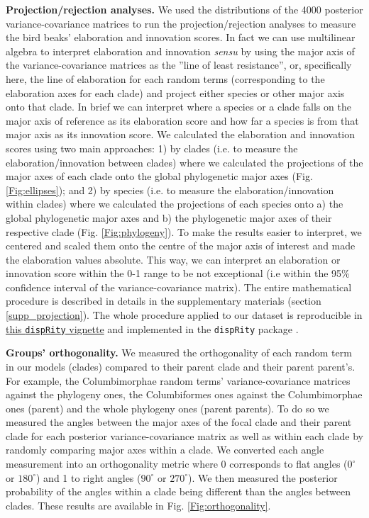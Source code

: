 \documentclass[12pt,letterpaper]{article}
\begin{document}
\textbf{Projection/rejection analyses.}
We used the distributions of the 4000 posterior variance-covariance matrices to run the projection/rejection analyses to measure the bird beaks' elaboration and innovation scores.
In fact we can use multilinear algebra to interpret elaboration and innovation \textit{sensu} \cite{endler2005animal} by using the major axis of the variance-covariance matrices as the ''line of least resistance'', or, specifically here, the line of elaboration for each random terms (corresponding to the elaboration axes for each clade) and project either species or other major axis onto that clade.
In brief we can interpret where a species or a clade falls on the major axis of reference as its elaboration score and how far a species is from that major axis as its innovation score.
We calculated the elaboration and innovation scores using two main approaches:
1) by clades (i.e. to measure the elaboration/innovation between clades) where we calculated the projections of the major axes of each clade onto the global phylogenetic major axes (Fig. \ref{Fig:ellipses});
and 2) by species (i.e. to measure the elaboration/innovation within clades) where we calculated the projections of each species onto a) the global phylogenetic major axes and b) the phylogenetic major axes of their respective clade (Fig. \ref{Fig:phylogeny}).
To make the results easier to interpret, we centered and scaled them onto the centre of the major axis of interest and made the elaboration values absolute.
This way, we can interpret an elaboration or innovation score within the 0-1 range to be not exceptional (i.e within the 95\% confidence interval of the variance-covariance matrix).
The entire mathematical procedure is described in details in the supplementary materials (section \ref{supp_projection}).
The whole procedure applied to our dataset is reproducible in \href{https://raw.rawgit.net/TGuillerme/dispRity/master/inst/vignettes/Projection_analysis.html}{this \texttt{dispRity} vignette} %
and implemented in the \texttt{dispRity} package \cite{dispRity}.

\textbf{Groups' orthogonality.}
We measured the orthogonality of each random term in our models (clades) compared to their parent clade and their parent parent's.
For example, the Columbimorphae random terms' variance-covariance matrices against the phylogeny ones, the Columbiformes ones against the Columbimorphae ones (parent) and the whole phylogeny ones (parent parents).
To do so we measured the angles between the major axes of the focal clade and their parent clade for each posterior variance-covariance matrix as well as within each clade by randomly comparing major axes within a clade.
We converted each angle measurement into an orthogonality metric where 0 corresponds to flat angles ($0^\circ$ or  $180^\circ$) and 1 to right angles ($90^\circ$ or $270^\circ$).
We then measured the posterior probability of the angles within a clade being different than the angles between clades.
These results are available in Fig. \ref{Fig:orthogonality}.
\end{document}
